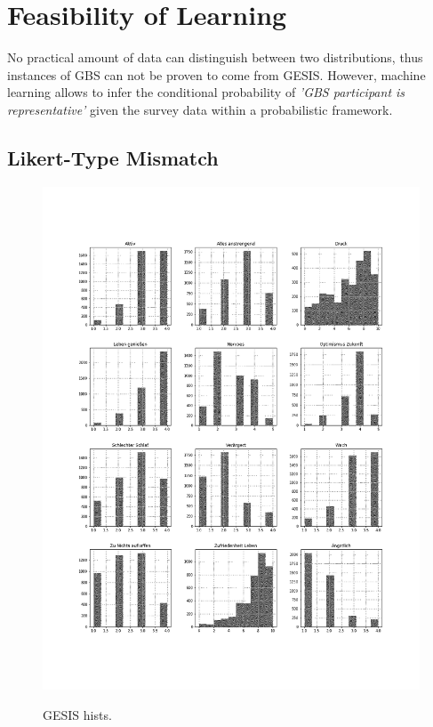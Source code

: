 \chapter{Feasibility of Learning}\label{Sec:Feasibility of Learning}

No practical amount of data can distinguish between two distributions, thus instances of GBS can not be proven to come from GESIS. However, machine learning allows to infer the conditional probability of \textit{'GBS participant is representative'} given the survey data within a probabilistic framework. 




\section{Likert-Type Mismatch}

\begin{figure}[ht]
	\begin{center}
		\includegraphics[scale=0.44,angle=0]{fig/gesis_hist}
		\label{std}
		\caption{GESIS hists.}
	\end{center}
\end{figure}

